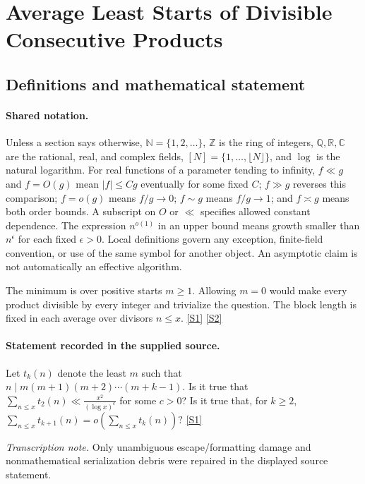 \documentclass[11pt,a4paper]{article}
\newcommand{\N}{\mathbb{N}}
\newcommand{\Z}{\mathbb{Z}}
\newcommand{\Q}{\mathbb{Q}}
\newcommand{\R}{\mathbb{R}}
\newcommand{\C}{\mathbb{C}}
\newcommand{\sref}[2]{\hyperlink{source:#1:#2}{[S#2]}}
\begin{document}
\section{Average Least Starts of Divisible Consecutive Products}\label{statement}


\subsection{Definitions and mathematical statement}

\paragraph{Shared notation.}Unless a section says otherwise, $\N=\{1,2,\ldots\}$,
$\Z$ is the ring of integers, $\Q,\R,\C$ are the rational, real, and complex
fields, $[N]=\{1,\ldots,\lfloor N\rfloor\}$, and $\log$ is the natural
logarithm. For real functions of a parameter tending to infinity,
$f\ll g$ and $f=O(g)$ mean $|f|\leq Cg$ eventually for some fixed $C$;
$f\gg g$ reverses this comparison; $f=o(g)$ means $f/g\to0$;
$f\sim g$ means $f/g\to1$; and $f\asymp g$ means both order bounds.
A subscript on $O$ or $\ll$ specifies allowed constant dependence.
The expression $n^{o(1)}$ in an upper bound means growth smaller than
$n^\epsilon$ for each fixed $\epsilon>0$. Local definitions govern any
exception, finite-field convention, or use of the same symbol for another
object. An asymptotic claim is not automatically an effective algorithm.



The minimum is over positive starts $m\geq1$. Allowing $m=0$ would make every product divisible by every integer and trivialize the question. The block length is fixed in each average over divisors $n\leq x$. \sref{statement}{1} \sref{statement}{2}

\paragraph{Statement recorded in the supplied source.}
Let $t_k(n)$ denote the least $m$ such that $ n\mid m(m+1)(m+2)\cdots (m+k-1). $ Is it true that $ \sum_{n\leq x}t_2(n)\ll \frac{x^2}{(\log x)^c} $ for some $c>0$?
Is it true that, for $k\geq 2$, $ \sum_{n\leq x}t_{k+1}(n) =o\left(\sum_{n\leq x}t_k(n)\right)? $ \sref{statement}{1}

{\small\emph{Transcription note.} Only unambiguous escape/formatting damage and nonmathematical serialization debris were repaired in the displayed source statement.}
\end{document}
